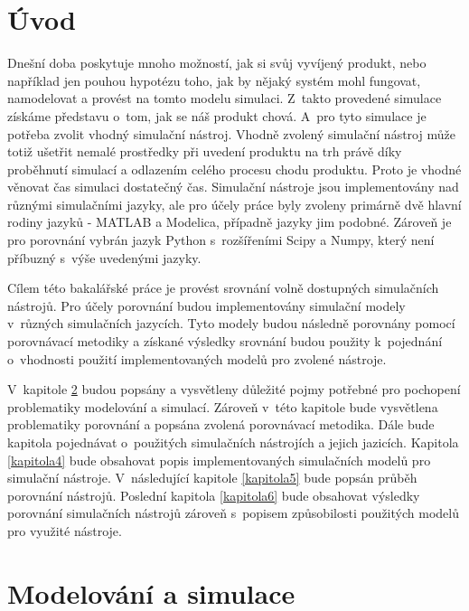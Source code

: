 \chapter{Úvod}

Dnešní doba poskytuje mnoho možností, jak si svůj vyvíjený produkt, nebo například jen pouhou hypotézu toho, jak by nějaký systém mohl fungovat, namodelovat a provést na tomto modelu simulaci. Z~takto provedené simulace získáme představu o~tom, jak se náš produkt chová. A~pro tyto simulace je potřeba zvolit vhodný simulační nástroj. Vhodně zvolený simulační nástroj může totiž ušetřit nemalé prostředky při uvedení produktu na trh právě díky proběhnutí simulací a odlazením celého procesu chodu produktu. Proto je vhodné věnovat čas simulaci dostatečný čas. Simulační nástroje jsou implementovány nad různými simulačními jazyky, ale pro účely práce byly zvoleny primárně dvě hlavní rodiny jazyků - MATLAB a Modelica, případně jazyky jim podobné. Zároveň je pro porovnání vybrán jazyk Python s~rozšířeními Scipy a Numpy, který není příbuzný s~výše uvedenými jazyky.

Cílem této bakalářské práce je provést srovnání volně dostupných simulačních nástrojů. Pro účely porovnání budou implementovány simulační modely v~různých simulačních jazycích. Tyto modely budou následně porovnány pomocí porovnávací metodiky a získané výsledky srovnání budou použity k~pojednání o~vhodnosti použití implementovaných modelů pro zvolené nástroje.

V~kapitole \ref{kapitola2} budou popsány a vysvětleny důležité pojmy potřebné pro pochopení problematiky modelování a simulací. Zároveň v~této kapitole bude vysvětlena problematiky porovnání a popsána zvolená porovnávací metodika. Dále bude kapitola pojednávat o~použitých simulačních nástrojích a jejich jazicích. Kapitola \ref{kapitola4} bude obsahovat popis implementovaných simulačních modelů pro simulační nástroje. V~následující kapitole \ref{kapitola5} bude popsán průběh porovnání nástrojů. Poslední kapitola \ref{kapitola6} bude obsahovat výsledky porovnání simulačních nástrojů zároveň s~popisem způsobilosti použitých modelů pro využité nástroje.

\chapter{Modelování a simulace}
\label{kapitola2}


